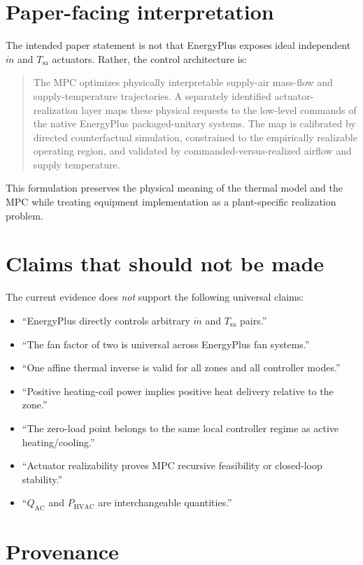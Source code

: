 \documentclass[11pt]{article}
\newcommand{\mdot}{\dot m}
\newcommand{\Qac}{Q_{\mathrm{AC}}}
\newcommand{\Phvac}{P_{\mathrm{HVAC}}}
\begin{document}
\section{Paper-facing interpretation}

The intended paper statement is not that EnergyPlus exposes ideal independent
$\mdot$ and $T_{\mathrm{sa}}$ actuators.  Rather, the control architecture is:
\begin{quote}
The MPC optimizes physically interpretable supply-air mass-flow and
supply-temperature trajectories.  A separately identified actuator-realization
layer maps these physical requests to the low-level commands of the native
EnergyPlus packaged-unitary systems.  The map is calibrated by directed
counterfactual simulation, constrained to the empirically realizable operating
region, and validated by commanded-versus-realized airflow and supply
temperature.
\end{quote}

This formulation preserves the physical meaning of the thermal model and the
MPC while treating equipment implementation as a plant-specific realization
problem.

\section{Claims that should not be made}

The current evidence does \emph{not} support the following universal claims:
\begin{itemize}[leftmargin=2em]
\item ``EnergyPlus directly controls arbitrary $\mdot$ and $T_{\mathrm{sa}}$ pairs.''
\item ``The fan factor of two is universal across EnergyPlus fan systems.''
\item ``One affine thermal inverse is valid for all zones and all controller
modes.''
\item ``Positive heating-coil power implies positive heat delivery relative to
the zone.''
\item ``The zero-load point belongs to the same local controller regime as
active heating/cooling.''
\item ``Actuator realizability proves MPC recursive feasibility or closed-loop
stability.''
\item ``$\Qac$ and $\Phvac$ are interchangeable quantities.''
\end{itemize}

\section{Provenance}
\end{document}
